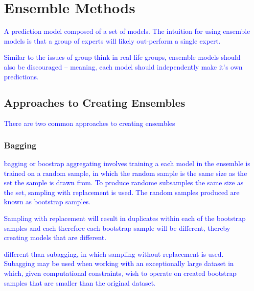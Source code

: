 \section{Ensemble Methods}


\textcolor{blue}{A prediction model composed of a set of models. The intuition for using ensemble models is that a group of experts will likely out-perform a single expert.}

\textcolor{blue}{Similar to the issues of group think in real life groups, ensemble models should also be discouraged -- meaning, each model should independently make it's own predictions.}


\subsection{Approaches to Creating Ensembles}

\textcolor{blue}{There are two common approaches to creating ensembles}

\subsubsection{Bagging}

\textcolor{blue}{{bagging} or {boostrap aggregating} involves training a each model in the ensemble is trained on a random sample, in which the random sample is the same size as the set the sample is drawn from. To produce randome subsamples the same size as the set, {sampling with replacement} is used. The random samples produced are known as {bootstrap samples}.}

\textcolor{blue}{Sampling with replacement will result in duplicates within each of the bootstrap samples and each therefore each bootstrap sample will be different, thereby creating models that are different.}

\textcolor{blue}{different than subagging, in which {sampling without replacement} is used. Subagging may be used when working with an exceptionally large dataset in which, given computational constraints, wish to operate on created bootstrap samples that are smaller than the original dataset.}

